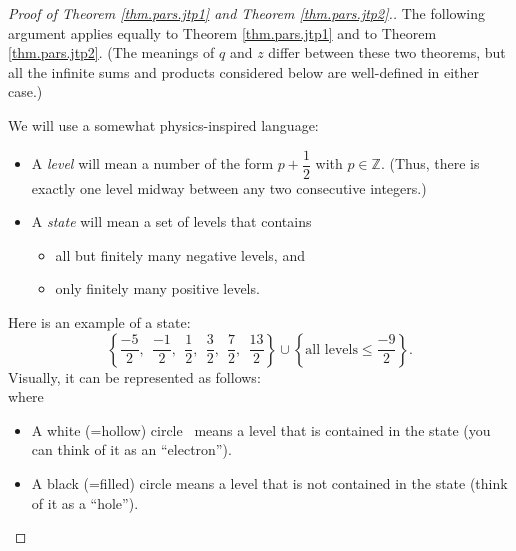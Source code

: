 \begin{proof}
[Proof of Theorem \ref{thm.pars.jtp1} and Theorem \ref{thm.pars.jtp2}.]The
following argument applies equally to Theorem \ref{thm.pars.jtp1} and to
Theorem \ref{thm.pars.jtp2}. (The meanings of $q$ and $z$ differ between these
two theorems, but all the infinite sums and products considered below are
well-defined in either case.)

We will use a somewhat physics-inspired language:

\begin{itemize}
\item A \emph{level} will mean a number of the form $p+\dfrac{1}{2}$ with
$p\in\mathbb{Z}$. (Thus, there is exactly one level midway between any two
consecutive integers.)

\item A \emph{state} will mean a set of levels that contains

\begin{itemize}
\item all but finitely many negative levels, and

\item only finitely many positive levels.
\end{itemize}
\end{itemize}

Here is an example of a state:%
\[
\left\{  \dfrac{-5}{2},\ \ \dfrac{-1}{2},\ \ \dfrac{1}{2},\ \ \dfrac{3}%
{2},\ \ \dfrac{7}{2},\ \ \dfrac{13}{2}\right\}  \cup\left\{  \text{all levels
}\leq\dfrac{-9}{2}\right\}  .
\]
Visually, it can be represented as follows:%
\[%
\]
where

\begin{itemize}
\item A white (=hollow) circle
%
\ means a level that is contained in the state (you can think of it as an
\textquotedblleft electron\textquotedblright).

\item A black (=filled) circle
means a level that is not contained in the state (think of it as a
\textquotedblleft hole\textquotedblright).
\end{itemize}


\end{proof}

